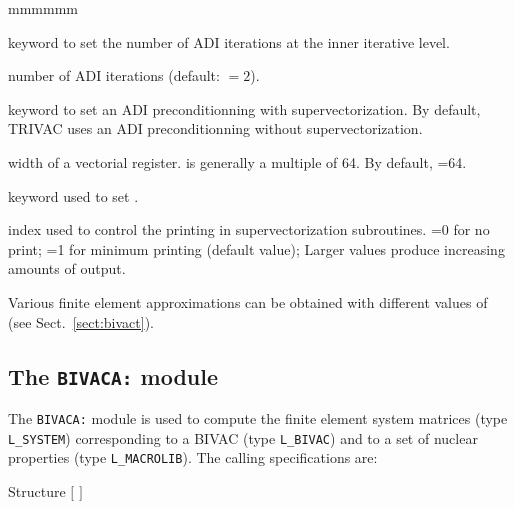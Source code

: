 \begin{ListeDeDescription}{mmmmmm}
\item[\moc{ADI}] keyword to set the number of ADI iterations at the inner
iterative level.

\item[\dusa{nadi}] number of ADI iterations (default:  $=2$).

\item[\moc{VECT}] keyword to set an ADI preconditionning with
supervectorization. By default, TRIVAC uses an ADI preconditionning without
supervectorization.

\item[\dusa{iseg}] width of a vectorial register.  is generally a multiple of 64. By default, =64.

\item[\moc{PRTV}] keyword used to set .

\item[\dusa{impv}] index used to control the  printing in supervectorization
subroutines. =0 for no print; =1 for minimum printing (default value); Larger
values produce increasing amounts of output.

\end{ListeDeDescription}
Various finite element approximations can be obtained with different values of  (see Sect.~\ref{sect:bivact}).
\clearpage

\subsection{The {\tt BIVACA:} module}

The {\tt BIVACA:} module is used to compute the finite element system matrices (type {\tt L\_SYSTEM}) corresponding to a BIVAC  (type {\tt L\_BIVAC}) and to a set of nuclear properties (type {\tt L\_MACROLIB}). The calling specifications are:

\begin{DataStructure}{Structure }
 \moc{:=}  $[$  $]$    \moc{::} 
\end{DataStructure}

